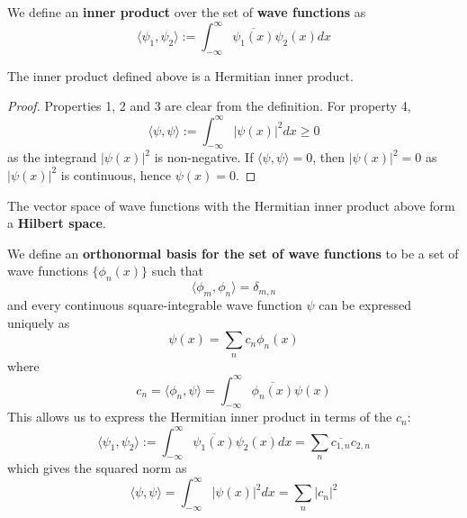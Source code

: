 \begin{definition}
	We define an \textbf{inner product} over the set of \textbf{wave functions} as
	\[
		\langle \psi_1, \psi_2 \rangle := \int_{-\infty}^{\infty} \overline{\psi_1(x)} \psi_2(x) dx
	\]
\end{definition}

\begin{proposition}
	The inner product defined above is a Hermitian inner product.
\end{proposition}

\begin{proof}
	Properties 1, 2 and 3 are clear from the definition. For property 4,
	\[
		\langle \psi, \psi \rangle := \int_{-\infty}^{\infty} |\psi(x)|^2 dx \ge 0
	\]
	as the integrand $|\psi(x)|^2$ is non-negative. If $\langle \psi, \psi \rangle = 0$, then $|\psi(x)|^2 = 0$ as $|\psi(x)|^2$ is continuous, hence $\psi(x) = 0$.
\end{proof}

\begin{definition}
	The vector space of wave functions with the Hermitian inner product above form a \textbf{Hilbert space}.
\end{definition}

\begin{definition}
	We define an \textbf{orthonormal basis for the set of wave functions} to be a set of wave functions $\{ \phi_n(x) \}$ such that
	\[
		\langle \phi_m, \phi_n \rangle = \delta_{m, n}
	\]
	and every continuous square-integrable wave function $\psi$ can be expressed uniquely as
	\[
		\psi(x) = \sum_n c_n \phi_n(x)
	\]
	where
	\[
		c_n = \langle \phi_n, \psi \rangle = \int_{-\infty}^{\infty} \overline{\phi_n(x)} \psi(x)
	\]
	This allows us to express the Hermitian inner product in terms of the $c_n$:
	\[
		\langle \psi_1, \psi_2 \rangle := \int_{-\infty}^{\infty} \overline{\psi_1(x)} \psi_2(x) dx = \sum_n \overline{c_{1, n}} c_{2, n}
	\]
	which gives the squared norm as
	\[
		\langle \psi, \psi \rangle = \int_{-\infty}^{\infty} |\psi(x)|^2 dx = \sum_n |c_n|^2
	\]
\end{definition}

